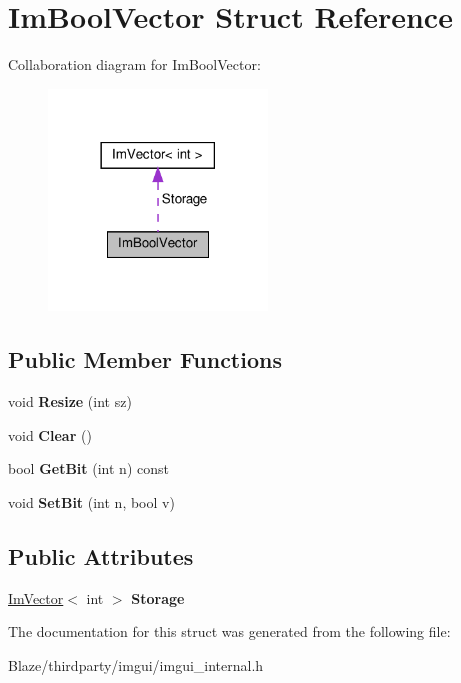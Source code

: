 \hypertarget{structImBoolVector}{}\section{Im\+Bool\+Vector Struct Reference}
\label{structImBoolVector}


Collaboration diagram for Im\+Bool\+Vector\+:\nopagebreak
\begin{figure}[H]
\begin{center}
\leavevmode
\includegraphics[width=165pt]{structImBoolVector__coll__graph}
\end{center}
\end{figure}
\subsection*{Public Member Functions}
\begin{DoxyCompactItemize}
\item 
\mbox{\label{structImBoolVector_a04e6342997659909349dae06beaef2b5}} 
void {\bfseries Resize} (int sz)
\item 
\mbox{\label{structImBoolVector_ad19ad8b86cc9f7dcd90f17be468b187e}} 
void {\bfseries Clear} ()
\item 
\mbox{\label{structImBoolVector_a59f48629843136aa2dc5dde5e8f35dfd}} 
bool {\bfseries Get\+Bit} (int n) const
\item 
\mbox{\label{structImBoolVector_a9354bd432f303f38e0a7f2d27db9703f}} 
void {\bfseries Set\+Bit} (int n, bool v)
\end{DoxyCompactItemize}
\subsection*{Public Attributes}
\begin{DoxyCompactItemize}
\item 
\mbox{\label{structImBoolVector_aeeac382bffd62712bb7b0f28db6b3045}} 
\hyperlink{structImVector}{Im\+Vector}$<$ int $>$ {\bfseries Storage}
\end{DoxyCompactItemize}


The documentation for this struct was generated from the following file\+:\begin{DoxyCompactItemize}
\item 
Blaze/thirdparty/imgui/imgui\+\_\+internal.\+h\end{DoxyCompactItemize}

